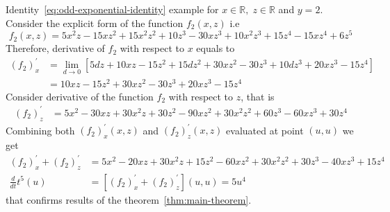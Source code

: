 \begin{example}
    \normalfont
    Identity~\eqref{eq:odd-exponential-identity} example for $x\in\mathbb{R}, \; z\in \mathbb{R}$ and $y=2$.
    Consider the explicit form of the function $f_{2} (x, z)$ i.e
    \[
        f_2 (x, z) = 5 x^2 z - 15 x z^2 + 15 x^2 z^2 + 10 z^3 - 30 x z^3 + 10 x^2 z^3 + 15 z^4 - 15 x z^4 + 6 z^5
    \]
    Therefore, derivative of $f_{2}$ with respect to $x$ equals to
    \begin{align*}
    (f_2)
        ^{'}_{x} &= \lim_{d \to 0} \left[ 5 d z + 10 x z - 15 z^2 + 15 d z^2 + 30 x z^2 - 30 z^3 + 10 d z^3 +
        20 x z^3 - 15 z^4 \right] \\
        &= 10 x z - 15 z^2 + 30 x z^2 - 30 z^3 + 20 x z^3 - 15 z^4
    \end{align*}
    Consider derivative of the function $f_2$ with respect to $z$, that is
    \begin{align*}
    (f_2)
        ^{'}_{z}
        &= 5 x^2 - 30 x z + 30 x^2 z + 30 z^2 - 90 x z^2 + 30 x^2 z^2 + 60 z^3 - 60 x z^3 + 30 z^4
    \end{align*}
    Combining both $(f_2)^{'}_{x} (x, z)$ and $(f_2)^{'}_{z} (x, z)$ evaluated at point $(u, u)$ we get
    \begin{align*}
    (f_2)
        ^{'}_{x} + (f_2)^{'}_{z} &= 5 x^2 - 20 x z + 30 x^2 z + 15 z^2 - 60 x z^2 + 30 x^2 z^2 + 30 z^3 - 40 x z^3 + 15 z^4\\
        \frac{d}{dt} t^{5} (u) &= [(f_2)^{'}_{x} + (f_2)^{'}_{z}] (u,u) = 5 u^4
    \end{align*}
    that confirms results of the theorem~\ref{thm:main-theorem}.
\end{example}

